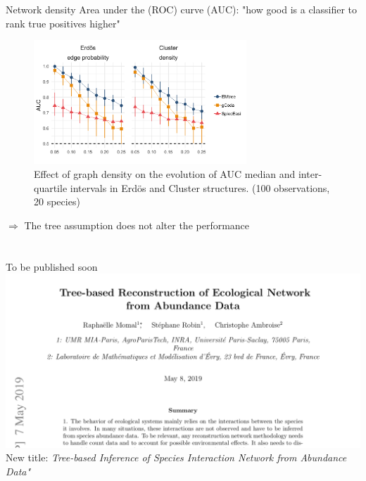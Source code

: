 \documentclass[11pt]{beamer}
\newcommand{\bleu}[1]{\textcolor{Framableulight}{#1}}
\begin{document}
\begin{frame}{Network density}
\footnotesize{\bleu{Area under the (ROC) curve (AUC):} "how good is a classifier to rank true positives higher"}\\
 \begin{figure}[H]
  \centering
  \includegraphics[width=8cm]{panel_dens.png}
  \caption{\scriptsize{Effect of graph density on the evolution of AUC median and inter-quartile intervals in Erdös and Cluster structures. (100 observations, 20 species)}}
\end{figure}
$\Rightarrow$ The tree assumption does not alter the performance
\end{frame}

\section{}\subsection{}

\begin{frame}{To be published soon}
    \includegraphics[width=\linewidth]{articleimag.png}
    New title: \textit{Tree-based Inference of Species Interaction Network from Abundance Data"}
\end{frame}
\end{document}
